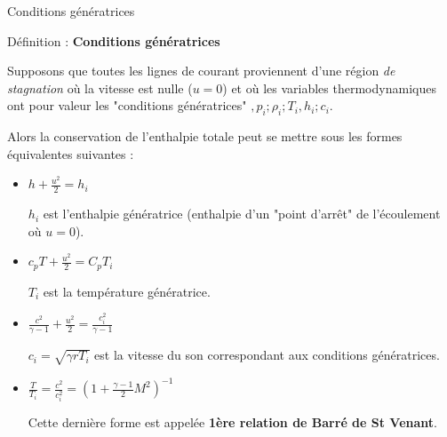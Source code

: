 \begin{frame}{Conditions génératrices} 

\small

Définition : {\bf  Conditions génératrices} 

Supposons que toutes les lignes de courant proviennent d'une région  {\em de stagnation} 
où la vitesse est nulle ($u=0$) et où les variables thermodynamiques ont pour valeur les  "conditions génératrices"  $,p_i ; \rho_i ; T_i, h_i ; c_i$. 
\smallskip
\pause

Alors la conservation de l'enthalpie totale peut se mettre sous les formes équivalentes suivantes :
\pause
\medskip
\begin{itemize}

\item $ h + \frac{u^2}{2} = h_i$ 

$h_i$ est l'enthalpie génératrice (enthalpie d'un "point d'arrêt" de l'écoulement où $u=0$).
\pause
\item $c_p T + \frac{u^2}{2} = C_p T_i$

 $T_i$ est la température génératrice.
\pause
\item $\frac{c^2}{\gamma-1} + \frac{u^2}{2}  = \frac{c_i^2}{\gamma-1}$

$c_i = \sqrt{\gamma r T_i}$ est la vitesse du son correspondant aux conditions génératrices.
\pause
\item $\frac{T}{T_i} = \frac{c^2}{c_i^2} = \left( 1 + \frac{\gamma-1}{2} M^2 \right)^{-1}$

Cette dernière forme est appelée {\bf 1ère relation de Barré de St Venant}. 

\end{itemize}




\end{frame}

